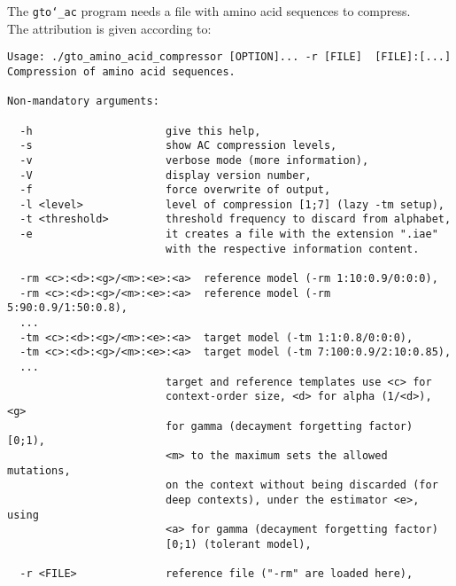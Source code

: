 The \texttt{gto\char`_ac} program needs a file with amino acid sequences to compress.\\
The attribution is given according to:
\begin{lstlisting}
Usage: ./gto_amino_acid_compressor [OPTION]... -r [FILE]  [FILE]:[...]                          
Compression of amino acid sequences.                                   
                                                                       
Non-mandatory arguments:                                               
                                                                       
  -h                     give this help,                               
  -s                     show AC compression levels,                   
  -v                     verbose mode (more information),              
  -V                     display version number,                       
  -f                     force overwrite of output,                    
  -l <level>             level of compression [1;7] (lazy -tm setup),  
  -t <threshold>         threshold frequency to discard from alphabet,
  -e                     it creates a file with the extension ".iae" 
                         with the respective information content.      
                                                                       
  -rm <c>:<d>:<g>/<m>:<e>:<a>  reference model (-rm 1:10:0.9/0:0:0),   
  -rm <c>:<d>:<g>/<m>:<e>:<a>  reference model (-rm 5:90:0.9/1:50:0.8),
  ...                                                                  
  -tm <c>:<d>:<g>/<m>:<e>:<a>  target model (-tm 1:1:0.8/0:0:0),       
  -tm <c>:<d>:<g>/<m>:<e>:<a>  target model (-tm 7:100:0.9/2:10:0.85), 
  ...                                                                  
                         target and reference templates use <c> for    
                         context-order size, <d> for alpha (1/<d>), <g>
                         for gamma (decayment forgetting factor) [0;1),
                         <m> to the maximum sets the allowed mutations,
                         on the context without being discarded (for   
                         deep contexts), under the estimator <e>, using
                         <a> for gamma (decayment forgetting factor)   
                         [0;1) (tolerant model),                       
                                                                       
  -r <FILE>              reference file ("-rm" are loaded here),     
                                                                       

\end{lstlisting}

